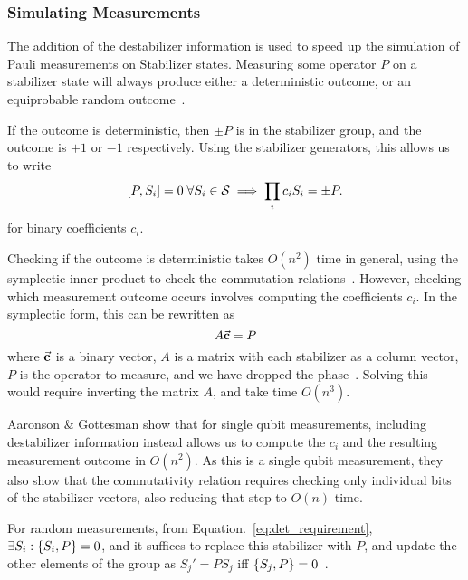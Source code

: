 \subsubsection*{Simulating Measurements}
The addition of the destabilizer information is  used to speed up the simulation of Pauli measurements on Stabilizer states. Measuring some operator $P$ on a stabilizer state will always produce either a deterministic outcome, or an equiprobable random outcome~\cite{Gottesman1998b}.\par
If the outcome is deterministic, then $\pm P$ is in the stabilizer group, and the outcome is $+1$ or $-1$ respectively. Using the stabilizer generators, this allows us to write 
\begin{equation}
    \comm{P}{S_{i}}=0\;\forall S_{i}\in\mathcal{S} \implies \prod_{i}c_{i}S_{i} = \pm P. \label{eq:det_requirement}
\end{equation}
for binary coefficients $c_{i}$.\par
Checking if the outcome is deterministic takes $O(n^{2})$ time in general, using the symplectic inner product to check the commutation relations~\cite{Dehaene2003}. However, checking which measurement outcome occurs involves computing the coefficients $c_{i}$. In the symplectic form, this can be rewritten as
\[
    A\va{c}=P
\]
where $\va{c}$ is a binary vector, $A$ is a matrix with each stabilizer as a column vector, $P$ is the operator to measure, and we have dropped the phase~\cite{Aaronson2004}. Solving this would require inverting the matrix $A$, and take time $O(n^{3})$.\par
Aaronson \& Gottesman show that for single qubit measurements, including destabilizer information instead allows us to compute the $c_{i}$ and the resulting measurement outcome in $O(n^{2})$. As this is a single qubit measurement, they also show that the commutativity relation requires checking only individual bits of the stabilizer vectors, also reducing that step to $O(n)$ time.\par
For random measurements, from Equation.~\ref{eq:det_requirement}, $\exists S_{i}:\acomm{S_{i}}{P}=0$, and it suffices to replace this stabilizer with $P$, and update the other elements of the group as $S_{j}'=PS_{j}$ iff $\acomm{S_{j}}{P}=0$~\cite{Gottesman1998b,Aaronson2004}.
